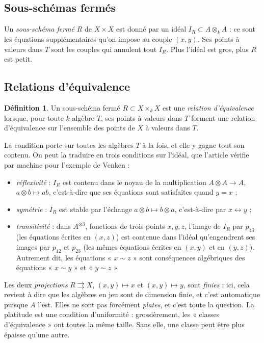 \documentclass[11pt,a4paper]{amsart}
\theoremstyle{definition}
\newtheorem{definition}{Définition}
\theoremstyle{plain}
\theoremstyle{remark}
\begin{document}
\subsection{Sous-schémas fermés}

Un \emph{sous-schéma fermé} $R$ de $X \times X$ est donné par un idéal $I_R \subset A \otimes_k A$ : ce sont les équations supplémentaires qu'on impose au couple $(x, y)$. Ses points à valeurs dans $T$ sont les couples qui annulent tout $I_R$. Plus l'idéal est gros, plus $R$ est petit.

\subsection{Relations d'équivalence}\label{sec:releq}

\begin{definition}
Un sous-schéma fermé $R \subset X \times_k X$ est une \emph{relation d'équivalence} lorsque, pour toute $k$-algèbre $T$, ses points à valeurs dans $T$ forment une relation d'équivalence sur l'ensemble des points de $X$ à valeurs dans $T$.
\end{definition}

La condition porte sur toutes les algèbres $T$ à la fois, et elle y gagne tout son contenu. On peut la traduire en trois conditions sur l'idéal, que l'article vérifie par machine pour l'exemple de Venken :
\begin{itemize}
\item \emph{réflexivité} : $I_R$ est contenu dans le noyau de la multiplication $A \otimes A \to A$, $a \otimes b \mapsto ab$, c'est-à-dire que ses équations sont satisfaites quand $y = x$ ;
\item \emph{symétrie} : $I_R$ est stable par l'échange $a \otimes b \mapsto b \otimes a$, c'est-à-dire par $x \leftrightarrow y$ ;
\item \emph{transitivité} : dans $A^{\otimes 3}$, fonctions de trois points $x, y, z$, l'image de $I_R$ par $p_{13}$ (les équations écrites en $(x, z)$) est contenue dans l'idéal qu'engendrent ses images par $p_{12}$ et $p_{23}$ (les mêmes équations écrites en $(x, y)$ et en $(y, z)$). Autrement dit, les équations « $x \sim z$ » sont conséquences algébriques des équations « $x \sim y$ » et « $y \sim z$ ».
\end{itemize}
Les deux \emph{projections} $R \rightrightarrows X$, $(x, y) \mapsto x$ et $(x, y) \mapsto y$, sont \emph{finies} : ici, cela revient à dire que les algèbres en jeu sont de dimension finie, et c'est automatique puisque $A$ l'est. Elles ne sont pas forcément \emph{plates}, et c'est toute la question. La platitude est une condition d'uniformité : grossièrement, les « classes d'équivalence » ont toutes la même taille. Sans elle, une classe peut être plus épaisse qu'une autre.
\end{document}
